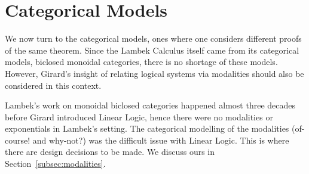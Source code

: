 \documentclass{entcs}
\begin{document}



\section{Categorical Models}

We now turn to the categorical models, ones where one considers
different proofs of the same theorem. Since the Lambek Calculus itself
came from its categorical models, biclosed monoidal categories, there
is no shortage of these models. However, Girard's insight of relating
logical systems via modalities should also be considered in this
context.

Lambek's work on monoidal biclosed categories happened almost three
decades before Girard introduced Linear Logic, hence there were no
modalities or exponentials in Lambek's setting. The categorical
modelling of the modalities (of-course! and why-not?) was the
difficult issue with Linear Logic.
This is where there are design decisions to be made. We discuss ours
in Section~\ref{subsec:modalities}.
\end{document}
